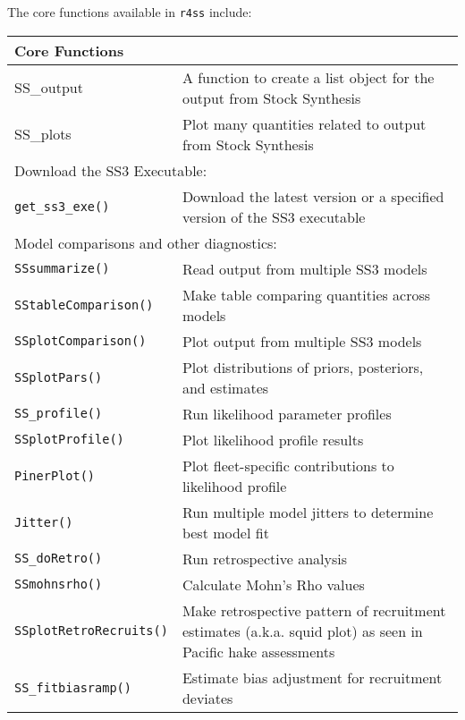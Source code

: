 The core functions available in \texttt{r4ss} include:
\begin{center}
	\begin{longtable}{p{4.6cm} p{10.52cm}}
		\hline
		Core Functions & \Tstrut\Bstrut\\
		\hline
		SS\_output \Tstrut & A function to create a list object for the output from Stock Synthesis \\
		SS\_plots  \Tstrut & Plot many quantities related to output from Stock Synthesis \\
		\hline
		
		\multicolumn{2}{l}{Download the SS3 Executable:} \Tstrut\Bstrut\\
		\hline
		\texttt{get\_ss3\_exe()} \Tstrut & Download the latest version or a specified version of the SS3 executable \\
		\hline
	
		\multicolumn{2}{l}{Model comparisons and other diagnostics:} \Tstrut\Bstrut\\
		\hline
		\texttt{SSsummarize()} \Tstrut & Read output from multiple SS3 models \\
		\texttt{SStableComparison()} \Tstrut & Make table comparing quantities across models \\
		\texttt{SSplotComparison()} \Tstrut & Plot output from multiple SS3 models \\
		\texttt{SSplotPars()} \Tstrut & Plot distributions of priors, posteriors, and estimates \\
		\texttt{SS\_profile()} \Tstrut & Run likelihood parameter profiles \\
		\texttt{SSplotProfile()} \Tstrut & Plot likelihood profile results \\
		\texttt{PinerPlot()} \Tstrut & Plot fleet-specific contributions to likelihood profile \\
		\texttt{Jitter()} \Tstrut & Run multiple model jitters to determine best model fit \\
		\texttt{SS\_doRetro()} \Tstrut & Run retrospective analysis \\
		\texttt{SSmohnsrho()} \Tstrut & Calculate Mohn's Rho values \\
		\texttt{SSplotRetroRecruits()} \Tstrut & Make retrospective pattern of recruitment estimates (a.k.a. squid plot) as seen in Pacific hake assessments\Bstrut \\
		\texttt{SS\_fitbiasramp()} \Tstrut & Estimate bias adjustment for recruitment deviates \Bstrut\\
		\hline
		

\end{longtable}
\end{center}
